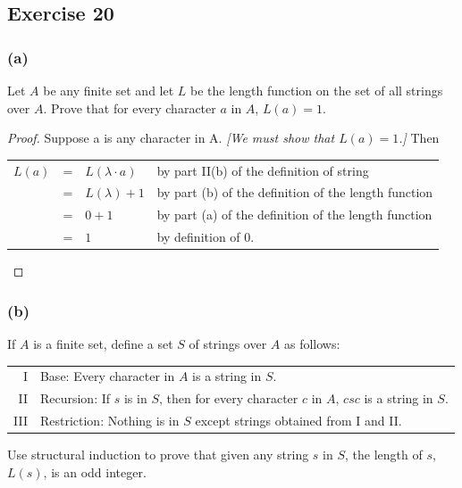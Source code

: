 \documentclass[14pt]{extarticle}
\newcommand{\cy}{\color{cyan}}
\begin{document}
\subsection{Exercise 20}

\subsubsection{(a)}
Let $A$ be any finite set and let $L$ be the length function on the set of all strings over $A$. 
Prove that for every character $a$ in $A$, $L(a) = 1$.

\begin{proof}
Suppose a is any character in A. {\it [We must show that \(L(a) = 1\).]} Then
\begin{center}
\begin{tabular}{rcll}
\(L(a)\) & = & \(L(\lambda \cdot a)\) & {\cy by part II(b) of the definition of string} \\
& = & \(L(\lambda) + 1\) & {\cy by part (b) of the definition of the length function} \\
& = & \(0 + 1\) & {\cy by part (a) of the definition of the length function} \\
& = & \(1\) & {\cy by definition of 0.}
\end{tabular}
\end{center}
\end{proof}

\subsubsection{(b)}
If $A$ is a finite set, define a set $S$ of strings over $A$ as follows:

\begin{tabular}{rl}
I & Base: Every character in $A$ is a string in $S$. \\
II & Recursion: If $s$ is in $S$, then for every character $c$ in $A$, $csc$ is a string in $S$.\\
III & Restriction: Nothing is in $S$ except strings obtained from I and II.
\end{tabular}

Use structural induction to prove that given any string $s$ in $S$, the length of $s$, $L(s)$, is an odd integer.
\end{document}
